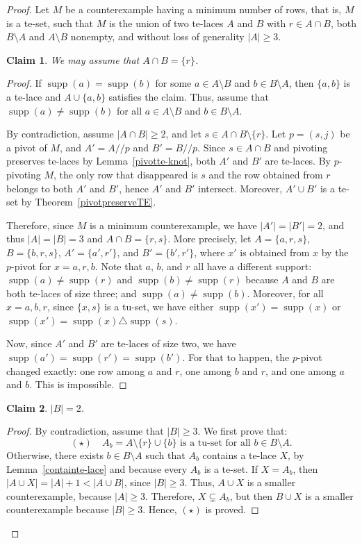 \documentclass[11pt,a4paper]{amsart}
\renewcommand*{\geq}{\geqslant}
\theoremstyle{plain}
\newtheorem{claimnumb}{Claim}[theorem]{\itshape}{\rmfamily}
\theoremstyle{definition}
\DeclareMathOperator{\supp}{supp}
\begin{document}
\begin{proof}
Let $M$ be a counterexample having a minimum number of rows, that is, $M$ is a te-set, such that $M$ is the union of two te-laces $A$ and $B$ with $r\in A\cap B$, both $B\setminus A$ and $A\setminus B$ nonempty, and without loss of generality $|A|\geq 3$.

\begin{claimnumb}\label{cl1}
We may assume that $A\cap B=\{r\}$. 
\end{claimnumb}
\begin{proof}
If $\supp(a) = \supp(b)$ for some $a\in A\setminus B$ and $b\in B\setminus A$, then $\{a,b\}$ is a te-lace and $A\cup \{a,b\}$ satisfies the claim.
Thus, assume that $\supp(a) \neq \supp(b)$ for all $a\in A\setminus B$ and $b\in B\setminus A$.

By contradiction, assume $|A\cap B|\geq 2$, and let $s\in A\cap B\setminus\{r\}$.
Let $p=(s,j)$ be a pivot of $M$, and $A'=A/\!\!/p$ and $B'=B/\!\!/p$.
Since $s\in A\cap B$ and pivoting preserves te-laces by Lemma~\ref{pivotte-knot}, both $A'$ and $B'$ are te-laces.
By $p$-pivoting $M$, the only row that disappeared is $s$ and the row obtained from $r$ belongs to both $A'$ and $B'$, hence $A'$ and $B'$ intersect.
Moreover, $A'\cup B'$ is a te-set by Theorem~\ref{pivotpreserveTE}.

Therefore, since $M$ is a minimum counterexample, we have $|A'|=|B'|=2$, and thus $|A|=|B|=3$ and $A\cap B =\{r,s\}$.
More precisely, let $A=\{a,r,s\}$, $B=\{b,r,s\}$, $A'=\{a',r'\}$, and $B'=\{b',r'\}$, where $x'$ is obtained from $x$ by the $p$-pivot for $x=a,r,b$.
Note that $a$, $b$, and $r$ all have a different support: $\supp(a)\neq \supp(r)$ and $\supp(b)\neq \supp(r)$ because $A$ and $B$ are both te-laces of size three; and $\supp(a)\neq \supp(b)$.
Moreover, for all $x=a,b,r$, since $\{x,s\}$ is a tu-set, we have either $\supp(x')=\supp(x)$ or $\supp(x')=\supp(x)\triangle \supp(s)$.

Now, since $A'$ and $B'$ are te-laces of size two, we have $\supp(a')=\supp(r')=\supp(b')$.
For that to happen, the $p$-pivot changed exactly: one row among $a$ and $r$, one among $b$ and $r$, and one among $a$ and $b$.
This is impossible.
\end{proof}

\begin{claimnumb}\label{cl2}
$|B|=2$.
\end{claimnumb}
\begin{proof}
By contradiction, assume that $|B|\geq 3$.
We first prove that: 
$$(\star) \quad A_b=A\setminus\{r\}\cup\{b\} \text{ is a tu-set for all $b\in B\setminus A$}.$$
Otherwise, there exists $b\in B\setminus A$ such that $A_b$ contains a te-lace $X$, by Lemma~\ref{containte-lace} and because every $A_b$ is a te-set.
If $X= A_b$, then $|A\cup X|=|A|+1<|A\cup B|$, since $|B|\geq 3$. Thus, $A\cup X$ is a smaller counterexample, because $|A|\geq 3$.
Therefore, $X\subsetneq A_b$, but then $B\cup X$ is a smaller counterexample because $|B|\geq 3$.
Hence, $(\star)$ is proved.
\medskip


\end{proof}
\end{proof}
\end{document}

